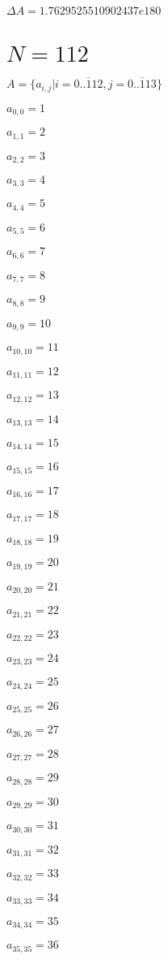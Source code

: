 \documentclass[a4paper,12pt]{article}
\begin{document}
$\Delta A = 1.7629525510902437e180$



\section{ $N = 112$ }
$A = \{ a _{ i, j } | i = \overline { 0..112 }, j = \overline { 0..113 } \}$

$a _{ 0, 0 } = 1$

$a _{ 1, 1 } = 2$

$a _{ 2, 2 } = 3$

$a _{ 3, 3 } = 4$

$a _{ 4, 4 } = 5$

$a _{ 5, 5 } = 6$

$a _{ 6, 6 } = 7$

$a _{ 7, 7 } = 8$

$a _{ 8, 8 } = 9$

$a _{ 9, 9 } = 10$

$a _{ 10, 10 } = 11$

$a _{ 11, 11 } = 12$

$a _{ 12, 12 } = 13$

$a _{ 13, 13 } = 14$

$a _{ 14, 14 } = 15$

$a _{ 15, 15 } = 16$

$a _{ 16, 16 } = 17$

$a _{ 17, 17 } = 18$

$a _{ 18, 18 } = 19$

$a _{ 19, 19 } = 20$

$a _{ 20, 20 } = 21$

$a _{ 21, 21 } = 22$

$a _{ 22, 22 } = 23$

$a _{ 23, 23 } = 24$

$a _{ 24, 24 } = 25$

$a _{ 25, 25 } = 26$

$a _{ 26, 26 } = 27$

$a _{ 27, 27 } = 28$

$a _{ 28, 28 } = 29$

$a _{ 29, 29 } = 30$

$a _{ 30, 30 } = 31$

$a _{ 31, 31 } = 32$

$a _{ 32, 32 } = 33$

$a _{ 33, 33 } = 34$

$a _{ 34, 34 } = 35$

$a _{ 35, 35 } = 36$
\end{document}

